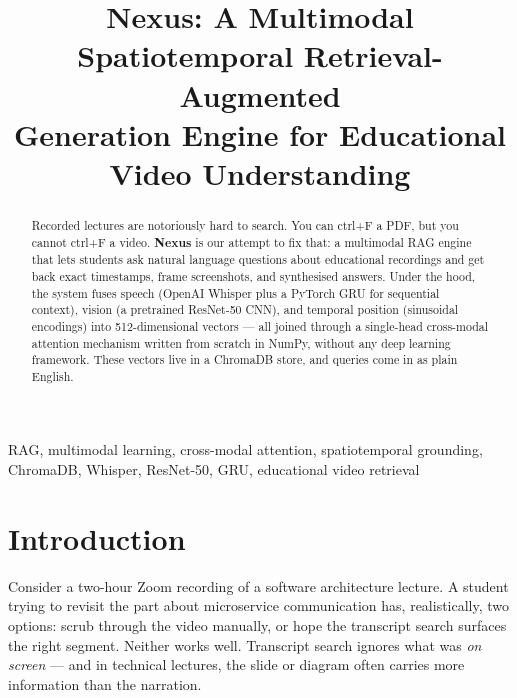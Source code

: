 \documentclass[conference]{IEEEtran}
\begin{document}
\title{Nexus: A Multimodal Spatiotemporal Retrieval-Augmented\\
Generation Engine for Educational Video Understanding}

\author{
}

\maketitle

\begin{abstract}
Recorded lectures are notoriously hard to search. You can ctrl+F a PDF, but
you cannot ctrl+F a video. \textbf{Nexus} is our attempt to fix that: a
multimodal RAG engine that lets students ask natural language questions about
educational recordings and get back exact timestamps, frame screenshots, and
synthesised answers. Under the hood, the system fuses speech (OpenAI Whisper
plus a PyTorch GRU for sequential context), vision (a pretrained ResNet-50
CNN), and temporal position (sinusoidal encodings) into 512-dimensional
vectors --- all joined through a single-head cross-modal attention mechanism
written from scratch in NumPy, without any deep learning framework. These
vectors live in a ChromaDB store, and queries come in as plain English.
\end{abstract}

\begin{IEEEkeywords}
RAG, multimodal learning, cross-modal attention, spatiotemporal grounding,
ChromaDB, Whisper, ResNet-50, GRU, educational video retrieval
\end{IEEEkeywords}

\section{Introduction}

Consider a two-hour Zoom recording of a software architecture lecture. A
student trying to revisit the part about microservice communication has,
realistically, two options: scrub through the video manually, or hope the
transcript search surfaces the right segment. Neither works well. Transcript
search ignores what was \emph{on screen} --- and in technical lectures, the
slide or diagram often carries more information than the narration.
\end{document}
